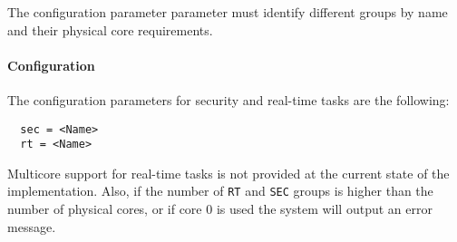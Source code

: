 The configuration parameter parameter must identify different groups by name
and their physical core requirements.




\paragraph{Configuration}
The configuration parameters for security and real-time tasks are the
following:
\begin{lstlisting}
  sec = <Name>
  rt = <Name>
\end{lstlisting}
Multicore support for real-time tasks is not provided at the current state of
the implementation.
Also, if the number of \texttt{RT} and \texttt{SEC} groups is higher than the number of physical
cores, or if core 0 is used the system will output an error message.
